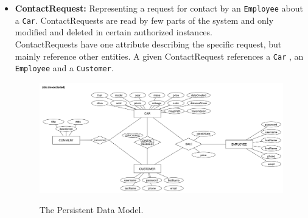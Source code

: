 \begin{itemize}
	\item \textbf{ContactRequest:} Representing a request for contact by an \texttt{Employee} about a \texttt{Car}. ContactRequests are read by few parts of the system and only modified and deleted in certain authorized instances. \\
	ContactRequests have one attribute describing the specific request, but mainly reference other entities. A given ContactRequest references a \texttt{Car} , an \texttt{Employee} and a \texttt{Customer}.
	\begin{figure}[H]
		\centering
			\includegraphics[scale=0.30]{Figures/PersistentDataModel}\\
		\caption{The Persistent Data Model.}
	\end{figure}
\end{itemize}